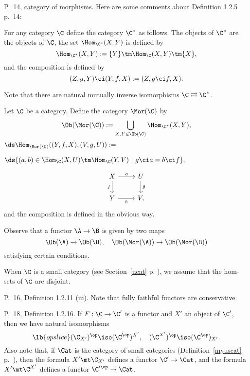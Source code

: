 \documentclass[12pt]{article}
\theoremstyle{remark}
\theoremstyle{definition}
\begin{document}
\begin{s}
P.~14, category of morphisms. Here are some comments about Definition 1.2.5 p.~14:

\begin{nota}
For any category $\C$ define the category $\C^*$\index{$\C^*$} as follows. The objects of $\C^*$ are the objects of $\C$, the set $\Hom_{\C^*}(X,Y)$ is defined by 
$$
\Hom_{\C^*}(X,Y):=\{Y\}\tm\Hom_{\C}(X,Y)\tm\{X\},
$$
and the composition is defined by 
$$
(Z,g,Y)\ci(Y,f,X):=(Z,g\ci f,X).
$$ 
\end{nota}

Note that there are natural mutually inverse isomorphisms $\C\rightleftarrows\C^*$. 

\begin{nota}
%
Let $\C$ be a category. Define the category $\Mor(\C)$ \index{$\Mor$} by 
$$
\Ob(\Mor(\C)):=\bigcup_{X,Y\in\Ob(\C)}\Hom_{\C^*}(X,Y),
$$
$\ds\Hom_{\Mor(\C)}((Y,f,X),(V,g,U)):=$\bigskip 

$\hfill\ds\{(a,b)\in\Hom_\C(X,U)\tm\Hom_\C(Y,V)\ | \ g\ci a=b\ci f\},$\bigskip

$$
\begin{tikzcd}
X\ar{d}[swap]{f}\ar{r}{a}&U\ar{d}{g}\\ 
Y\ar{r}[swap]{b}&V,
\end{tikzcd}
$$ 
and the composition is defined in the obvious way.
\end{nota}

Observe that a functor $\A\to\B$ is given by two maps 
$$
\Ob(\A)\to\Ob(\B),\quad\Ob(\Mor(\A))\to\Ob(\Mor(\B))
$$ 
satisfying certain conditions.

When $\C$ is a small category (see Section~\ref{ucat} p. ), we assume that the hom-sets of $\C$ are disjoint.
\end{s}

%

\begin{s}
P.~16, Definition 1.2.11 (iii). Note that fully faithful functors are conservative. 
\end{s}

%

\begin{s}
P.~18, Definition 1.2.16. If $F:\C\to\C'$ is a functor and $X'$ an object of $\C'$, then we have natural isomorphisms 
\begin{equation}\lb{opslice}
(\C_{X'})^{\op}\iso(\C^{\op})^{X'},\quad(\C^{X'})^{\op}\iso(\C^{\op})_{X'}.
\end{equation} 
Also note that, if $\Cat$ is the category of small categories (Definition~\ref{myuscat} p.~), then the formula $X'\mt\C_{X'}$ defines a functor $\C'\to\Cat$, and the formula $X'\mt\C^{X'}$ defines a functor $\C'^{\op}\to\Cat$.
\end{s}
\end{document}
